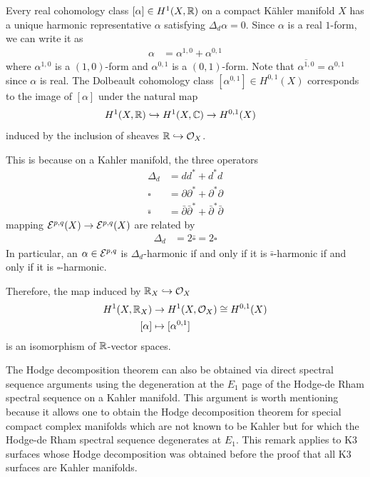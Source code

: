 \documentclass[12pt]{article}
\begin{document}
\begin{remark}

Every real cohomology class $[\alpha] \in H^1(X, \mathbb{R})$ on a compact K\"ahler manifold $X$ has a unique harmonic representative $\alpha$ satisfying $\Delta_d \alpha = 0$. Since $\alpha$ is a real $1$-form, we can write it as \begin{align*}
    \alpha & = \alpha^{1,0} + \alpha^{0,1}
\end{align*} where $\alpha^{1,0}$ is a $(1,0)$-form and $\alpha^{0,1}$ is a $(0,1)$-form. Note that $\overline{\alpha^{1,0}} = \alpha^{0,1}$ since $\alpha$ is real. The Dolbeault cohomology class $[\alpha^{0,1}] \in H^{0,1}(X)$ corresponds to the image of $[\alpha]$ under the natural map \begin{align*}
    H^1(X, \mathbb{R}) & \hookrightarrow H^1(X, \mathbb{C}) \to H^{0,1}(X)
\end{align*} induced by the inclusion of sheaves $\mathbb{R} \hookrightarrow \mathcal{O}_X$.

This is because on a Kahler manifold, the three operators 
\begin{align*}
    \Delta_d & = d d^* + d^* d \\
    \square & = \partial \partial^* + \partial^* \partial \\
    \bar\square & = \bar{\partial} \bar{\partial}^* + \bar{\partial}^* \bar{\partial}
\end{align*} mapping ${\mathcal{E}}^{p,q}(X) \to {\mathcal{E}}^{p,q}(X)$ are related by \begin{align*}
    \Delta_d & = 2 \bar\square = 2 \square
\end{align*}
In particular, an $\alpha\in{\mathcal{E}}^{p,q}$ is $\Delta_d$-harmonic if and only if it is $\bar\square$-harmonic if and only if it is $\square$-harmonic.

Therefore, the map induced by $\mathbb{R}_X \hookrightarrow \mathcal{O}_X$ 
\begin{align*}
    H^1(X, \mathbb{R}_X) & \to H^1(X,{\mathcal{O}}_X) \cong H^{0,1}(X) \\
    [\alpha] & \mapsto [\alpha^{0,1}]
\end{align*} is an isomorphism of $\mathbb{R}$-vector spaces.
\end{remark}

\begin{remark}
    The Hodge decomposition theorem can also be obtained via direct spectral sequence arguments using the degeneration at the $E_1$ page of the Hodge-de Rham spectral sequence on a Kahler manifold. This argument is worth mentioning because it allows one to obtain the Hodge decomposition theorem for special compact complex manifolds which are not known to be Kahler but for which the Hodge-de Rham spectral sequence degenerates at $E_1$. This remark applies to K3 surfaces whose Hodge decomposition was obtained before the proof that all K3 surfaces are Kahler manifolds.
\end{remark}
\end{document}
